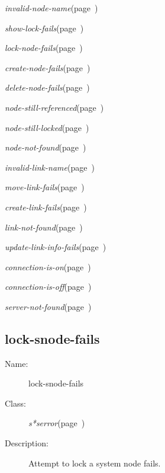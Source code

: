 \begin{description}
\item {\sl invalid-node-name}\hfill(page~\pageref{invalid-node-name})
\item {\sl show-lock-fails}\hfill(page~\pageref{show-lock-fails})
\item {\sl lock-node-fails}\hfill(page~\pageref{lock-node-fails})
\item {\sl create-node-fails}\hfill(page~\pageref{create-node-fails})
\item {\sl delete-node-fails}\hfill(page~\pageref{delete-node-fails})
\item {\sl node-still-referenced}\hfill(page~\pageref{node-still-referenced})
\item {\sl node-still-locked}\hfill(page~\pageref{node-still-locked})
\item {\sl node-not-found}\hfill(page~\pageref{node-not-found})

\item {\sl invalid-link-name}\hfill(page~\pageref{invalid-link-name})
\item {\sl move-link-fails}\hfill(page~\pageref{move-link-fails})
\item {\sl create-link-fails}\hfill(page~\pageref{create-link-fails})
\item {\sl link-not-found}\hfill(page~\pageref{link-not-found})
\item {\sl update-link-info-fails}\hfill(page~\pageref{update-link-info-fails})

\item {\sl connection-is-on}\hfill(page~\pageref{connection-is-on})
\item {\sl connection-is-off}\hfill(page~\pageref{connection-is-off})
\item {\sl server-not-found}\hfill(page~\pageref{server-not-found})









\end{description}
\horizontalline

\subsection{lock-snode-fails}
\label{lock-snode-fails}

\begin{description}
\item [Name:]  lock-snode-fails

\item [Class:]
{\sl s*serror}\hfill(page~\pageref{s*serror})

\item [Description:]
Attempt to lock a system node fails.


\end{description}
\horizontalline

